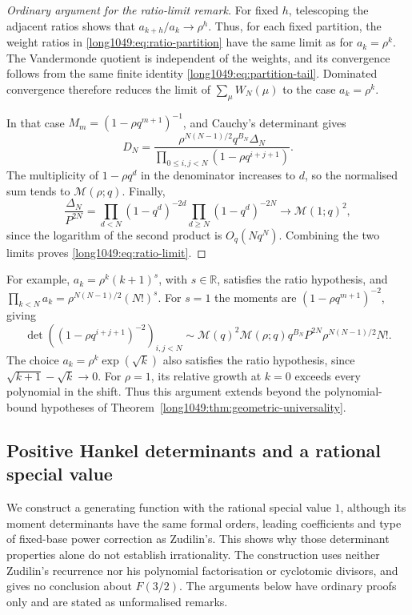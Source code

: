 \documentclass[11pt]{article}
\begin{document}
\begin{proof}[Ordinary argument for the ratio-limit remark]
For fixed $h$, telescoping the adjacent ratios shows that
$a_{k+h}/a_k\to \rho^h$. Thus, for each fixed partition, the weight
ratios in \eqref{long1049:eq:ratio-partition} have the same limit as for
$a_k=\rho^k$. The Vandermonde quotient is independent of the
weights, and its convergence follows from the same finite identity
\eqref{long1049:eq:partition-tail}. Dominated convergence
therefore reduces the limit of $\sum_\mu W_N(\mu)$ to the case
$a_k=\rho^k$.

In that case $M_m=(1-\rho q^{m+1})^{-1}$, and Cauchy's determinant gives
\[
 D_N=\frac{\rho^{N(N-1)/2}q^{B_N}\Delta_N}
 {\prod_{0\le i,j<N}(1-\rho q^{i+j+1})}.
\]
The multiplicity of $1-\rho q^d$ in the denominator increases to $d$,
so the normalised sum tends to $\mathcal M(\rho;q)$. Finally,
\[
 \frac{\Delta_N}{P^{2N}}
 =\prod_{d<N}(1-q^d)^{-2d}\prod_{d\ge N}(1-q^d)^{-2N}
 \longrightarrow\mathcal M(1;q)^2,
\]
since the logarithm of the second product is $O_q(Nq^N)$.
Combining the two limits proves \eqref{long1049:eq:ratio-limit}.
\end{proof}

For example, $a_k=\rho^k(k+1)^s$, with $s\in\mathbb R$, satisfies
the ratio hypothesis, and
$\prod_{k<N}a_k=\rho^{N(N-1)/2}(N!)^s$.
For $s=1$ the moments are $(1-\rho q^{m+1})^{-2}$, giving
\[
 \det\left((1-\rho q^{i+j+1})^{-2}\right)_{i,j<N}
 \sim\mathcal M(q)^2\mathcal M(\rho;q)
       q^{B_N}P^{2N}\rho^{N(N-1)/2}N!.
\]
The choice $a_k=\rho^k\exp(\sqrt{k})$ also satisfies the ratio
hypothesis, since $\sqrt{k+1}-\sqrt{k}\to0$.
For $\rho=1$, its relative growth at $k=0$ exceeds every polynomial in the shift.
Thus this argument extends beyond the polynomial-bound hypotheses of
Theorem~\ref{long1049:thm:geometric-universality}.



\subsection{Positive Hankel determinants and a rational special value}
\label{long1049:sec:calibrated-countermodel}

We construct a generating function with the rational special value
$1$, although its moment determinants have the same formal orders,
leading coefficients and type of fixed-base power correction as
Zudilin's. This shows why those determinant properties alone do not
establish irrationality. The construction uses neither Zudilin's
recurrence nor his polynomial factorisation or cyclotomic divisors,
and gives no conclusion about $F(3/2)$. The arguments below have
ordinary proofs only and are stated as unformalised remarks.
\end{document}
